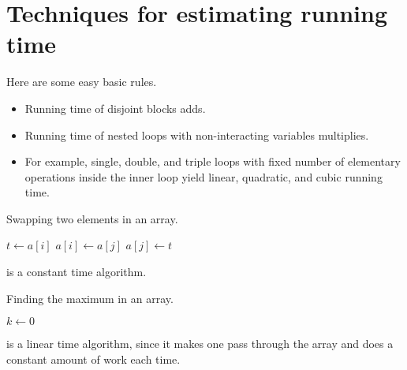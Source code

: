 \chapter{Techniques for estimating running time} %
Here are some easy basic rules.
\begin{itemize}
\item Running time of disjoint blocks adds.
\item Running time of nested loops with non-interacting variables multiplies.
\item For example, single, double, and triple loops with fixed number of elementary operations inside the inner loop yield linear, quadratic, and cubic running time.
\end{itemize}

\begin{algorithm}[H]
  \caption{Swapping two elements in an array.}
  \label{alg:swap}
\begin{algorithmic}[0]
	\State $t \gets a[i]$
	\State $a[i] \gets a[j]$
	\State $a[j] \gets t$
	\State {}
\EndFunction
\end{algorithmic}
\end{algorithm}
  is a constant time algorithm.


\begin{algorithm}[H]
  \caption{Finding the maximum in an array.
    \label{alg:findmax}}
\begin{algorithmic}[0]
	\State $k \gets 0$ 
		\EndIf
	\EndFor
	\State {}
\EndFunction
\end{algorithmic}
\end{algorithm}
 is a linear time algorithm, since it makes one pass through the array and does a constant amount of work each time.


